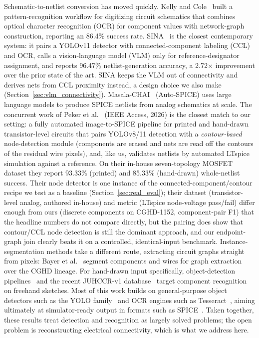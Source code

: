 \documentclass{ieeeaccess}
\begin{document}
Schematic-to-netlist conversion has moved quickly. Kelly and Cole~\cite{kelly2024digitizing} built a pattern-recognition workflow for digitizing circuit schematics that combines optical character recognition (OCR) for component values with network-graph construction, reporting an 86.4\% success rate. SINA~\cite{sina2026} is the closest contemporary system: it pairs a YOLOv11 detector with connected-component labeling (CCL) and OCR, calls a vision-language model (VLM) only for reference-designator assignment, and reports 96.47\% netlist-generation accuracy, a 2.72$\times$ improvement over the prior state of the art. SINA keeps the VLM out of connectivity and derives nets from CCL proximity instead, a design choice we also make (Section~\ref{sec:vlm_connectivity}). Masala-CHAI~\cite{masalachai2024} (Auto-SPICE) uses large language models to produce SPICE netlists from analog schematics at scale. The concurrent work of Peker et al.~\cite{peker2026} (IEEE Access, 2026) is the closest match to our setting: a fully automated image-to-SPICE pipeline for printed and hand-drawn transistor-level circuits that pairs YOLOv8/11 detection with a \emph{contour-based} node-detection module (components are erased and nets are read off the contours of the residual wire pixels), and, like us, validates netlists by automated LTspice simulation against a reference. On their in-house seven-topology MOSFET dataset they report 93.33\% (printed) and 85.33\% (hand-drawn) whole-netlist success. Their node detector is one instance of the connected-component/contour recipe we test as a baseline (Section~\ref{sec:real_eval}); their dataset (transistor-level analog, authored in-house) and metric (LTspice node-voltage pass/fail) differ enough from ours (discrete components on CGHD-1152, component-pair F1) that the headline numbers do not compare directly, but the pairing does show that contour/CCL node detection is still the dominant approach, and our endpoint-graph join clearly beats it on a controlled, identical-input benchmark. Instance-segmentation methods take a different route, extracting circuit graphs straight from pixels: Bayer et al.~\cite{instanceseg2023} segment components and wires for graph extraction over the CGHD lineage. For hand-drawn input specifically, object-detection pipelines~\cite{handdrawn2021} and the recent JUHCCR-v1 database~\cite{juhccr2025} target component recognition on freehand sketches. Most of this work builds on general-purpose object detectors such as the YOLO family~\cite{redmon2016yolo,jocher2023yolo} and OCR engines such as Tesseract~\cite{smith2007tesseract}, aiming ultimately at simulator-ready output in formats such as SPICE~\cite{nagel1973spice}. Taken together, these results treat detection and recognition as largely solved problems; the open problem is reconstructing electrical connectivity, which is what we address here.
\end{document}
